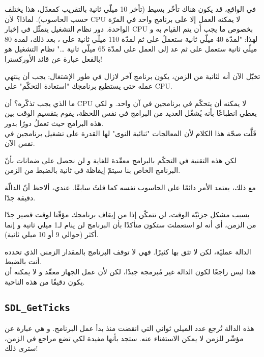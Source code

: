 في الواقع، قد يكون هناك تأخّر بسيط (تأخر 10 ميلّي ثانية بالتقريب كمعدّل، هذا يختلف حسب الحاسوب). لماذا؟ لأن
\textenglish{CPU}
لا يمكنه العمل إلا على برنامج واحد في المرّة الواحدة. دور نظام التشغيل يتمثّل في إخبار
\textenglish{CPU}
بخصوص ما يجب أن يتم القيام به و لهذا: "لمدّة 40 ميلّي ثانية ستعملُ على
ثم لمدّة 110 ميلّي ثانية على 
،
بعد ذلك، لمدة 80 ميلّي ثانية ستعمل على
ثم عد إلى العمل على
لمدّة 65 ميلّي ثانية
\dots"
نظام التشغيل هو بالفعل عبارة عن قائد الأوركسترا!

تخيّل الآن أنه لثانية من الزمن، يكون برنامج آخر لازال في طور الإشتغال: يجب أن ينتهي عمله حتى يستطيع برنامجك "استعادة التحكّم" على
\textenglish{CPU}.

ما الذي يجب تذكّره؟ أن
\textenglish{CPU}
لا يمكنه أن يتحكّم في برنامجين في آن واحد. و لكي يعطي انطباعًا بأنه يُشغّل العديد من البرامج في نفس اللحظة، يقوم بتقسيم الوقت بين هذه البرامج حيث تعملُ دورًا بدور.\\
قَلَّت صحّة هذا الكلام لأن المعالجات "ثنائية النوى" لها القدرة على تشغيل برنامجين في نفس الآن. 

لكن هذه التقنية في التحكّم بالبرامج معقّدة للغاية و لن نحصل على ضمانات بأنّ البرنامج الخاص بنا سيتمّ إيقاظة في ثانية بالضبط من الزمن.

مع ذلك، يعتمد الأمر دائمًا على الحاسوب نفسه كما قلتُ سابقًا. عندي، ألاحظ أنّ الدالّة
دقيقة جدّا.
\begin{information}
 بسبب مشكل جزئيّة الوقت، لن تتمكّن إذا من إيقاف برنامجك مؤقّتا لوقت قصير جدّا من الزمن، أي أنه لو استعملت 
ستكون متأكدًا بأن البرنامج لن ينام لـ1 ميلي ثانية و إنما أكثر (حوالي 9 أو 10 ميلي ثانية).
\end{information}

الدالة
عمليّة، لكن لا تثق بها كثيرًا. فهي لا توقف البرنامج بالمقدار الزمني الذي تحدده أنت بالضبط. \\
هذا ليس راجعًا لكون الدالة غير مُبرمجة جيدًا، لكن لأن عمل الجهاز معقّد و لا يمكنه أن يكون دقيقًا من هذه الناحية.

\subsection{\texttt{SDL\_GetTicks}}

هذه الدالة تُرجع عدد الميلي ثواني التي انقضت منذ بدأ عمل البرنامج. و هي عبارة عن مؤشّر للزمن لا يمكن الاستغناء عنه. ستجد بأنها مفيدة لكي تضع مراجع في الزمن، سترى ذلك!

